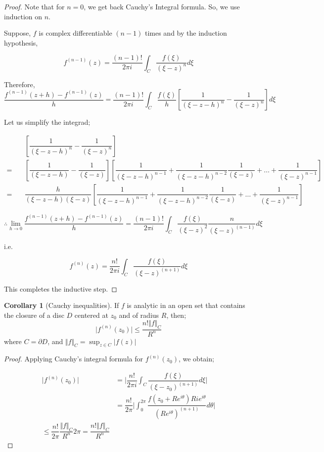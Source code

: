 \documentclass[12pt]{article}
\theoremstyle{definition}
\newtheorem{cor}{Corollary}
\newenvironment{corollary}{
\begin{tcolorbox}[colback=blue!5!white,colframe=blue!75!black, parbox = false]\begin{cor} }{\end{cor}\end{tcolorbox} }
\begin{document}
\begin{proof}
    Note that for $n = 0$, we get back Cauchy's Integral formula. 
    So, we use induction on $n$.

    Suppose, $f$ is complex differentiable $(n-1)$ times and by the induction hypothesis,

    $$f^{(n-1)}(z) = \dfrac{(n-1)!}{2\pi i} \int_{C} \dfrac{f(\xi)}{(\xi - z)^n} d\xi$$

    Therefore,
    $$
    \dfrac{f^{(n-1)}(z + h) - f^{(n-1)}(z)}{h} 
    = \dfrac{(n-1)!}{2\pi i} \int_{C} \dfrac{f(\xi)}{h} \left[ \dfrac{1}{(\xi - z - h)^n} - \dfrac{1}{(\xi - z)^n} \right]d\xi
    $$

    Let us simplify the integrad;
    
    \begin{align*}
        & \left[ \dfrac{1}{(\xi - z - h)^n} - \dfrac{1}{(\xi - z)^n} \right]\\
        = \quad & \left[ \dfrac{1}{(\xi - z - h)} - \dfrac{1}{(\xi - z)} \right] \left[ \dfrac{1}{(\xi - z - h)^{n-1}} + \dfrac{1}{(\xi - z - h)^{n-2}}\dfrac{1}{(\xi - z)} + \dots + \dfrac{1}{(\xi - z)^{n-1}}  \right]\\
        = \quad & \dfrac{h}{(\xi - z - h)(\xi - z)} \left[ \dfrac{1}{(\xi - z - h)^{n-1}} + \dfrac{1}{(\xi - z - h)^{n-2}}\dfrac{1}{(\xi - z)} + \dots + \dfrac{1}{(\xi - z)^{n-1}}  \right]
    \end{align*}

    $$
    \therefore \lim_{h\rightarrow 0} \dfrac{f^{(n-1)}(z + h) - f^{(n-1)}(z)}{h} = \dfrac{(n-1)!}{2\pi i} \int_{C} \dfrac{f(\xi)}{(\xi - z)^2} \dfrac{n}{(\xi - z)^{(n-1)}} d\xi
    $$

    i.e.

    $$f^{(n)}(z) = \dfrac{n!}{2\pi i} \int_{C} \dfrac{f(\xi)}{(\xi - z)^{(n+1)}} d\xi$$

    This completes the inductive step.
\end{proof}

\begin{corollary}[Cauchy inequalities]
    If $f$ is analytic in an open set that contains the closure of a disc $D$ centered at $z_0$ and of radius $R$, then;
    $$\vert f^{(n)}(z_0) \vert \leq \dfrac{n! \Vert f\Vert_C}{R^n}$$
    where $C = \partial D$, and $\Vert f\Vert_C = \sup_{z \in C} \vert f(z) \vert$
\end{corollary}

\begin{proof}
    Applying Cauchy's integral formula for $f^{(n)}(z_0)$, we obtain;

    \begin{align*}
        \vert f^{(n)}(z_0) \vert 
        & = \vert \dfrac{n!}{2\pi i} \int_C \dfrac{f(\xi)}{(\xi - z_0)^{(n+1)}}d\xi \vert\\
        & = \dfrac{n!}{2\pi} \vert \int_{0}^{2\pi} \dfrac{f(z_0 + R e^{i\theta}) R i e^{i\theta}}{(Re^{i\theta})^{(n+1)}} d\theta \vert\\
        \leq \dfrac{n!}{2\pi} \dfrac{\Vert f \Vert_C}{R^n} 2\pi
        = \dfrac{n! \Vert f\Vert_C}{R^n}
    \end{align*}
\end{proof}
\end{document}
